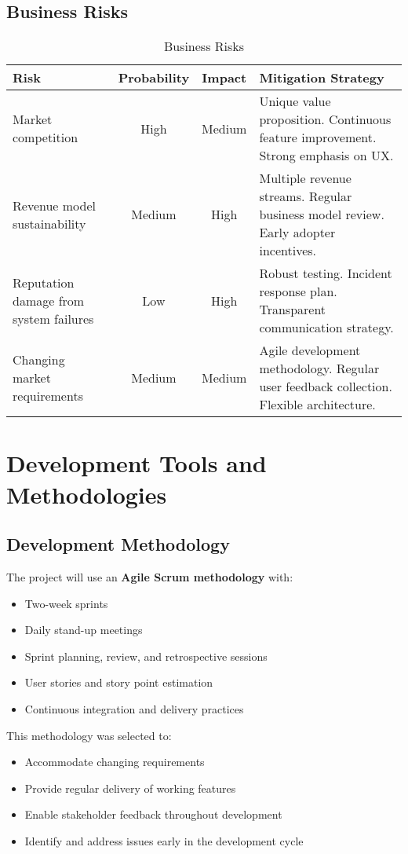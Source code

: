 \documentclass[12pt,a4paper]{article}
\begin{document}
\subsection{Business Risks}

\begin{table}[h]
\begin{tabularx}{\textwidth}{|X|c|c|X|}
\hline
\textbf{Risk} & \textbf{Probability} & \textbf{Impact} & \textbf{Mitigation Strategy} \\
\hline
Market competition & High & Medium & Unique value proposition. Continuous feature improvement. Strong emphasis on UX. \\
\hline
Revenue model sustainability & Medium & High & Multiple revenue streams. Regular business model review. Early adopter incentives. \\
\hline
Reputation damage from system failures & Low & High & Robust testing. Incident response plan. Transparent communication strategy. \\
\hline
Changing market requirements & Medium & Medium & Agile development methodology. Regular user feedback collection. Flexible architecture. \\
\hline
\end{tabularx}
\caption{Business Risks}
\end{table}

\section{Development Tools and Methodologies}

\subsection{Development Methodology}

The project will use an \textbf{Agile Scrum methodology} with:
\begin{itemize}
    \item Two-week sprints
    \item Daily stand-up meetings
    \item Sprint planning, review, and retrospective sessions
    \item User stories and story point estimation
    \item Continuous integration and delivery practices
\end{itemize}

This methodology was selected to:
\begin{itemize}
    \item Accommodate changing requirements
    \item Provide regular delivery of working features
    \item Enable stakeholder feedback throughout development
    \item Identify and address issues early in the development cycle
\end{itemize}
\end{document}
